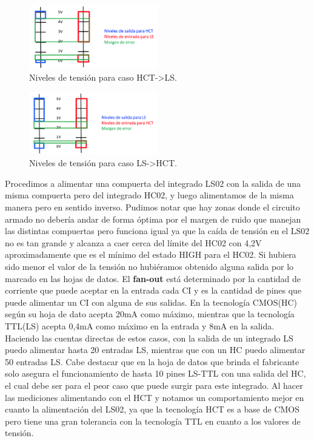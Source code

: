 \begin{figure}[h]%
   \centering
    \includegraphics[width=0.5\textwidth]{HCT->LS}
    \caption{Niveles de tensi\'on para caso HCT->LS.} %
\end{figure}

\begin{figure}[h]%
   \centering
    \includegraphics[width=0.5\textwidth]{LS->HCT}
    \caption{Niveles de tensi\'on para caso LS->HCT.} %
\end{figure}

Procedimos a alimentar una compuerta del integrado LS02 con la salida de una misma compuerta pero del integrado HC02, y luego alimentamos de la misma manera pero en sentido inverso. Pudimos notar que hay zonas donde el circuito armado no deber\'ia andar de forma \'optima por el margen de ruido que manejan las distintas compuertas pero funciona igual ya que la ca\'ida de tensi\'on en el LS02 no es tan grande y alcanza a caer cerca del l\'imite del HC02 con 4,2V aproximadamente que es el m\'inimo del estado HIGH para el HC02. Si hubiera sido menor el valor de la tensi\'on no hubi\'eramos obtenido alguna salida por lo marcado en las hojas de datos.
\newline
El \textbf{fan-out} est\'a determinado por la cantidad de corriente que puede aceptar en la entrada cada CI y es la cantidad de pines que puede alimentar un CI con alguna de sus salidas. En la tecnolog\'ia CMOS(HC) seg\'un su hoja de dato acepta 20mA como m\'aximo, mientras que la tecnolog\'ia TTL(LS) acepta 0,4mA como m\'aximo en la entrada y 8mA en la salida. Haciendo las cuentas directas de estos casos, con la salida de un integrado LS puedo alimentar hasta 20 entradas LS, mientras que con un HC puedo alimentar 50 entradas LS. Cabe destacar que en la hoja de datos que brinda el fabricante solo asegura el funcionamiento de hasta 10 pines LS-TTL con una salida del HC, el cual debe ser para el peor caso que puede surgir para este integrado.
\newline
Al hacer las mediciones alimentando con el HCT y notamos un comportamiento mejor en cuanto la alimentaci\'on del LS02, ya que la tecnolog\'ia HCT es a base de CMOS pero tiene una gran tolerancia con la tecnolog\'ia TTL en cuanto a los valores de tensi\'on.



